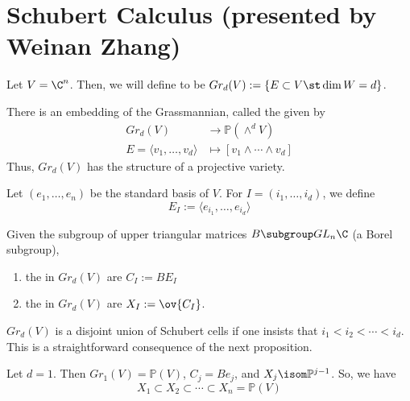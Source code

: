 \documentclass[11pt,leqno,oneside]{amsbook}
\renewcommand{\P}{\mathbb{P}}
\numberwithin{thm}{section}
\newcommand{\Gr}{Gr}
\begin{document}
\section{Schubert Calculus (presented by Weinan Zhang)}
\begin{defn}
  Let \(V = \C^n\). Then, we will define  to be \(\Gr_d(V) := \{E \subset V
  \st \dim W = d\}\). 
\end{defn}
\begin{prop}
  There is an embedding of the Grassmannian, called the
   given by
  \begin{align*}
    \Gr_d(V) & \to \P\left(\wedge^d V  \right) \\
    E = \langle v_1, \ldots, v_d \rangle & \mapsto [v_1 \wedge \cdots
                                           \wedge v_d]
  \end{align*}
  Thus, \(\Gr_d(V)\) has the structure of a projective variety.
\end{prop}
\begin{defn}
  Let \((e_1, \ldots, e_n)\) be the standard basis of \(V\). For \(I =
  (i_1, \ldots, i_d)\), we define \[
    E_I := \langle e_{i_1}, \ldots, e_{i_d} \rangle
  \]
\end{defn}
\begin{defn}
  Given the subgroup of upper triangular matrices \(B \subgroup
  GL_n\C\) (a Borel subgroup),
  \begin{enumerate}
  \item the  in \(\Gr_d(V)\) are \(C_I := BE_I\)
  \item the  in \(\Gr_d(V)\) are \(X_I :=
    \ov{C_I}\). 
  \end{enumerate}
\end{defn}
\begin{rmk}
  \(\Gr_d(V)\) is a disjoint union of Schubert cells if one insists
  that \(i_1 < i_2 < \cdots < i_d\). This is a
  straightforward consequence of the next proposition.
\end{rmk}
\begin{example}
  Let \(d=1\). Then \(\Gr_1(V) = \P(V)\), \(C_j = Be_j\), and \(X_j
  \isom \P^{j-1}\). So, we have \[
    X_1 \subset X_2 \subset \cdots \subset X_n = \P(V)
  \]
\end{example}
\end{document}
